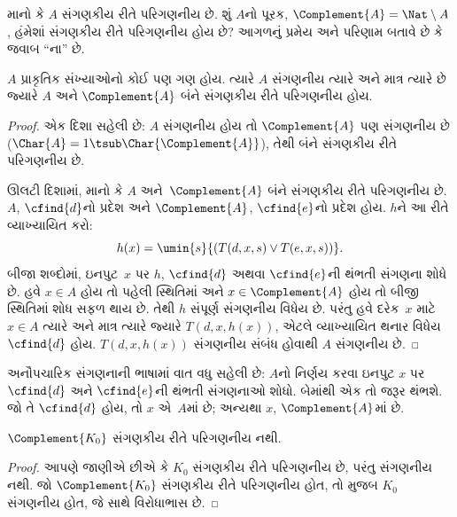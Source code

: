 \documentclass[../../../include/open-logic-section]{subfiles}
\begin{document}

માનો કે $A$ સંગણકીય રીતે પરિગણનીય છે. શું $A$નો પૂરક,
$\Complement{A} = \Nat \setminus A$, હંમેશાં સંગણકીય રીતે
પરિગણનીય હોય છે? આગળનું પ્રમેય અને પરિણામ બતાવે છે કે
જવાબ ``ના'' છે.

\begin{thm}
$A$ પ્રાકૃતિક સંખ્યાઓનો કોઈ પણ ગણ હોય. ત્યારે $A$ સંગણનીય
ત્યારે અને માત્ર ત્યારે છે જ્યારે $A$ અને $\Complement{A}$
બંને સંગણકીય રીતે પરિગણનીય હોય.
\end{thm}

\begin{proof}
એક દિશા સહેલી છે: $A$ સંગણનીય હોય તો $\Complement{A}$ પણ
સંગણનીય છે ($\Char{A} = 1 \tsub
\Char{\Complement{A}}$), તેથી બંને સંગણકીય રીતે પરિગણનીય છે.

ઊલટી દિશામાં, માનો કે $A$ અને~$\Complement{A}$ બંને
સંગણકીય રીતે પરિગણનીય છે. $A$, $\cfind{d}$નો પ્રદેશ
અને $\Complement{A}$, $\cfind{e}$નો પ્રદેશ હોય. $h$ને
આ રીતે વ્યાખ્યાયિત કરો:
\[
h(x) = \umin{s}{(T(d,x,s) \lor T(e,x,s))}.
\]
બીજા શબ્દોમાં, ઇનપુટ~$x$ પર $h$, $\cfind{d}$ અથવા
$\cfind{e}$ની થંભતી સંગણના શોધે છે. હવે $x \in A$ હોય
તો પહેલી સ્થિતિમાં અને $x \in \Complement{A}$ હોય તો
બીજી સ્થિતિમાં શોધ સફળ થાય છે. તેથી $h$ સંપૂર્ણ સંગણનીય
વિધેય છે. પરંતુ હવે દરેક~$x$ માટે $x \in A$ ત્યારે અને
માત્ર ત્યારે જ્યારે $T(d, x, h(x))$, એટલે વ્યાખ્યાયિત
થનાર વિધેય $\cfind{d}$ હોય. $T(d, x, h(x))$ સંગણનીય
સંબંધ હોવાથી $A$ સંગણનીય છે.
\end{proof}

\begin{explain}
અનૌપચારિક સંગણનાની ભાષામાં વાત વધુ સહેલી છે: $A$નો નિર્ણય
કરવા ઇનપુટ $x$ પર $\cfind{d}$ અને $\cfind{e}$ની થંભતી
સંગણનાઓ શોધો. બેમાંથી એક તો જરૂર થંભશે. જો તે
$\cfind{d}$ હોય, તો $x$ એ~$A$માં છે; અન્યથા
$x$, $\Complement{A}$માં છે.
\end{explain}

\begin{cor}
$\Complement{K_0}$ સંગણકીય રીતે પરિગણનીય નથી.
\end{cor}

\begin{proof}
આપણે જાણીએ છીએ કે $K_0$ સંગણકીય રીતે પરિગણનીય છે,
પરંતુ સંગણનીય નથી. જો $\Complement{K_0}$ સંગણકીય રીતે
પરિગણનીય હોત, તો  મુજબ $K_0$
સંગણનીય હોત, જે  સાથે વિરોધાભાસ છે.
\end{proof}
\end{document}
